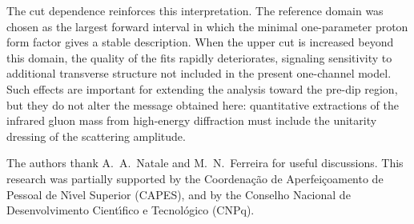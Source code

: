 \documentclass[aps,prd,twocolumn,superscriptaddress,longbibliography,nofootinbib]{revtex4-2}
\begin{document}
The cut dependence reinforces this interpretation. The reference domain
was chosen as the largest forward interval in which the minimal
one-parameter proton form factor gives a stable description. When the
upper cut is increased beyond this domain, the quality of the fits
rapidly deteriorates, signaling sensitivity to additional transverse
structure not included in the present one-channel model. Such effects
are important for extending the analysis toward the pre-dip region, but
they do not alter the message obtained here: quantitative extractions of
the infrared gluon mass from high-energy diffraction must include the
unitarity dressing of the scattering amplitude.

\begin{acknowledgments}

The authors thank A.~A.~Natale and M.~N.~Ferreira for useful discussions. This research was partially supported by the Coordena\c{c}\~ao de Aperfei\c{c}oamento de Pessoal de N\'{\i}vel Superior (CAPES), and by the Conselho Nacional de Desenvolvimento Cient\'{\i}fico e Tecnol\'ogico (CNPq).

\end{acknowledgments}
\end{document}
